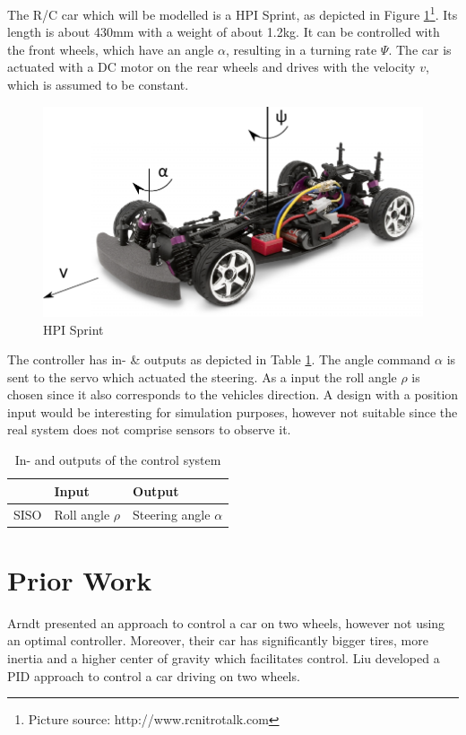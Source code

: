 \documentclass[conference]{IEEEtran}
\begin{document}
The R/C car which will be modelled is a HPI Sprint, as depicted in Figure \ref{figure:hpi_sprint}\footnote{Picture source: http://www.rcnitrotalk.com}. Its length is about 430mm with a weight of about 1.2kg. It can be controlled with the front wheels, which have an angle $\alpha$, resulting in a turning rate $\Psi$. The car is actuated with a DC motor on the rear wheels and drives with the velocity $v$, which is assumed to be constant.  

\begin{figure}[h!]
\centering
  \includegraphics[width=.3\textwidth]{pics/hpisprintgeom.pdf} 
  \caption{HPI Sprint}  
  \label{figure:hpi_sprint}
\end{figure}

The controller has in- \& outputs as depicted in Table \ref{figure:controlinout}. The angle command $\alpha$ is sent to the servo which actuated the steering. As a input the roll angle $\rho$ is chosen since it also corresponds to the vehicles direction. A design with a position input would be interesting for simulation purposes, however not suitable since the real system does not comprise sensors to observe it.

\begin{table}[h]
\begin{center}
\begin{tabular}{|l||l|l|}
\hline
 		& Input 		& Output\\
\hline
SISO 	& Roll angle $\rho$ 	& Steering angle $\alpha$\\
\hline
\end{tabular}
\caption{In- and outputs of the control system}  
\label{figure:controlinout}
\end{center}
\end{table}


\section{Prior Work}

Arndt \cite{bib:arndt} presented an approach to control a car on two wheels, however not using an optimal controller. Moreover, their car has significantly bigger tires, more inertia and a higher center of gravity which facilitates control. Liu \cite{bib:liu} developed a PID approach to control a car driving on two wheels.
\end{document}
